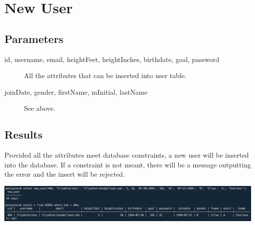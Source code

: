 \section{New User}

\subsection{Parameters}
\begin{description}
    \item [id, username, email, heightFeet, heightInches, birthdate, goal, password] All the attributes that can be inserted into user table.
    \item [joinDate, gender, firstName, mInitial, lastName] See above.
\end{description}

\subsection{Results}
Provided all the attributes meet database constraints, a new user will be inserted into the database. If a constraint is not meant, there will be a message outputting the error and the insert will be rejected.

\begin{center}
\includegraphics[width=\columnwidth]{include/assets/screenshots/new_user}
\end{center}